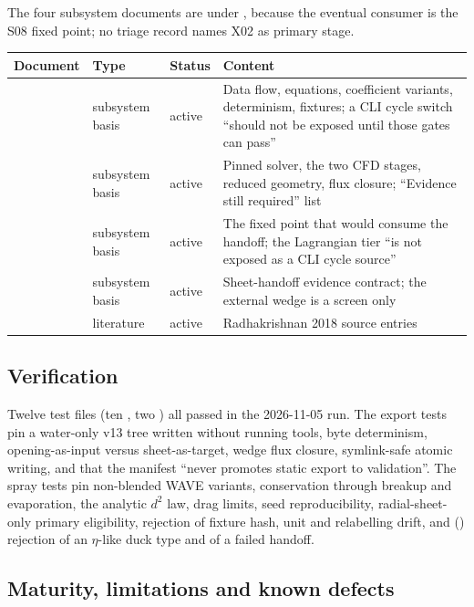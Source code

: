The four subsystem documents are under , because the eventual consumer is the S08 fixed point; no triage record names X02 as primary stage.

\begingroup\chtenTables
\begin{longtable}{@{}P{4.6cm}P{1.8cm}P{1.2cm}P{8.5cm}@{}}
\toprule Document & Type & Status & Content \\ \midrule\endhead
{} & subsystem basis & active & Data flow, equations, coefficient variants, determinism, fixtures; a CLI cycle switch ``should not be exposed until those gates can pass'' \\
 & subsystem basis & active & Pinned solver, the two CFD stages, reduced geometry, flux closure; ``Evidence still required'' list \\
 & subsystem basis & active & The fixed point that would consume the handoff; the Lagrangian tier ``is not exposed as a CLI cycle source'' \\
 & subsystem basis & active & Sheet-handoff evidence contract; the external wedge is a screen only \\
 & literature & active & Radhakrishnan 2018 source entries \\
\bottomrule
\end{longtable}
\endgroup

\subsection{Verification}

Twelve test files (ten , two ) all passed in the 2026-11-05 run. The export tests pin a water-only v13 tree written without running tools, byte determinism, opening-as-input versus sheet-as-target, wedge flux closure, symlink-safe atomic writing, and that the manifest ``never promotes static export to validation''. The spray tests pin non-blended WAVE variants, conservation through breakup and evaporation, the analytic $d^2$ law, drag limits, seed reproducibility, radial-sheet-only primary eligibility, rejection of fixture hash, unit and relabelling drift, and () rejection of an $\eta$-like duck type and of a failed handoff.

\subsection{Maturity, limitations and known defects}

